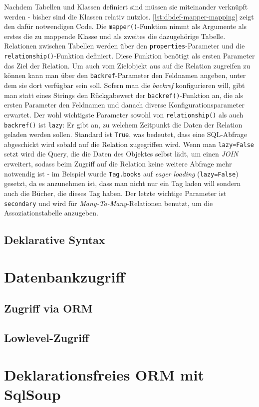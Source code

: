

Nachdem Tabellen und Klassen definiert sind müssen sie miteinander verknüpft
werden - bisher sind die Klassen relativ nutzlos.
\autoref{lst:dbdef-mapper-mapping} zeigt den dafür notwendigen Code. Die
\texttt{mapper()}-Funktion nimmt als Argumente als erstes die zu mappende Klasse
und als zweites die dazugehörige Tabelle. Relationen zwischen Tabellen werden
über den \texttt{properties}-Parameter und die \texttt{relationship()}-Funktion
definiert. Diese Funktion benötigt als ersten Parameter das Ziel der Relation.
Um auch vom Zielobjekt aus auf die Relation zugreifen zu können kann man über
den \texttt{backref}-Parameter den Feldnamen angeben, unter dem sie dort
verfügbar sein soll. Sofern man die \emph{backref} konfigurieren will, gibt
man statt eines Strings den Rückgabewert der \texttt{backref()}-Funktion an, die
als ersten Parameter den Feldnamen und danach diverse Konfigurationsparameter
erwartet. Der wohl wichtigste Parameter sowohl von \texttt{relationship()} als
auch \texttt{backref()} ist \texttt{lazy}: Er gibt an, zu welchem Zeitpunkt die
Daten der Relation geladen werden sollen. Standard ist \texttt{True}, was
bedeutet, dass eine SQL-Abfrage abgeschickt wird sobald auf die Relation
zugegriffen wird. Wenn man \texttt{lazy=False} setzt wird die Query, die die
Daten des Objektes selbst lädt, um einen \emph{JOIN} erweitert, sodass beim
Zugriff auf die Relation keine weitere Abfrage mehr notwendig ist - im Beispiel
wurde \texttt{Tag.books} auf \emph{eager loading} (\texttt{lazy=False}) gesetzt,
da es anzunehmen ist, dass man nicht nur ein Tag laden will sondern auch die
Bücher, die dieses Tag haben. Der letzte wichtige Parameter ist
\texttt{secondary} und wird für \emph{Many-To-Many}-Relationen benutzt, um die
Assoziationstabelle anzugeben.




\subsection{Deklarative Syntax}

\section{Datenbankzugriff}
\subsection{Zugriff via ORM}
\subsection{Lowlevel-Zugriff}

\section{Deklarationsfreies ORM mit SqlSoup}

